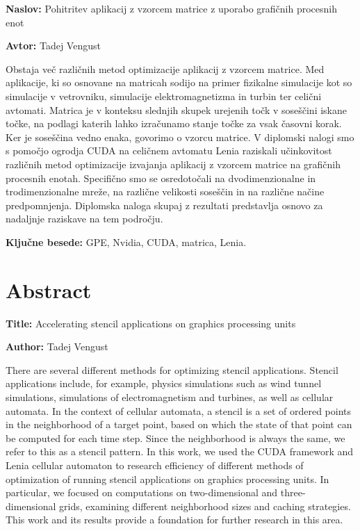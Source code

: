 \documentclass[a4paper, 12pt, openright]{book}
\newcommand{\ttitle}{Pohitritev aplikacij z vzorcem matrice z uporabo grafičnih procesnih enot}
\newcommand{\ttitleEn}{Accelerating stencil applications on graphics processing units}
\newcommand{\tauthor}{Tadej Vengust}
\newcommand{\tkeywords}{GPE, Nvidia, CUDA, matrica, Lenia}
\newcommand{\clearemptydoublepage}{\newpage{\pagestyle{empty}\cleardoublepage}}
\begin{document}
\noindent\textbf{Naslov:} \ttitle
\bigskip

\noindent\textbf{Avtor:} \tauthor
\bigskip

\noindent
Obstaja več različnih metod optimizacije aplikacij z vzorcem matrice.
Med aplikacije, ki so osnovane na matricah sodijo na primer fizikalne simulacije kot so simulacije v vetrovniku, simulacije elektromagnetizma in turbin ter celični avtomati.
Matrica je v konteksu slednjih skupek urejenih točk v soseščini iskane točke, na podlagi katerih lahko izračunamo stanje točke za vsak časovni korak. Ker je soseščina vedno enaka, govorimo o vzorcu matrice.
V diplomski nalogi smo s pomočjo ogrodja CUDA na celičnem avtomatu Lenia raziskali učinkovitost različnih metod optimizacije izvajanja aplikacij z vzorcem matrice na grafičnih procesnih enotah.
Specifično smo se osredotočali na dvodimenzionalne in trodimenzionalne mreže, na različne velikosti soseščin in na različne načine predpomnjenja.
Diplomska naloga skupaj z rezultati predstavlja osnovo za nadaljnje raziskave na tem področju.
\bigskip

\noindent\textbf{Ključne besede:} \tkeywords.
\clearemptydoublepage

{}
\chapter*{Abstract}

\noindent\textbf{Title:} \ttitleEn
\bigskip

\noindent\textbf{Author:} \tauthor
\bigskip

\noindent
There are several different methods for optimizing stencil applications.
Stencil applications include, for example, physics simulations such as wind tunnel simulations, simulations of electromagnetism and turbines, as well as cellular automata.
In the context of cellular automata, a stencil is a set of ordered points in the neighborhood of a target point, based on which the state of that point can be computed for each time step.
Since the neighborhood is always the same, we refer to this as a stencil pattern.
In this work, we used the CUDA framework and Lenia cellular automaton to research efficiency of different methods of optimization of running stencil applications on graphics processing units.
In particular, we focused on computations on two-dimensional and three-dimensional grids, examining different neighborhood sizes and caching strategies.
This work and its results provide a foundation for further research in this area.
\bigskip
\end{document}
